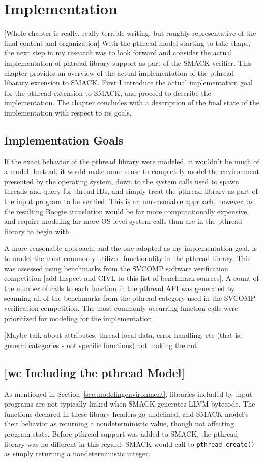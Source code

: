 \chapter{Implementation}\label{ch:implementation}
[Whole chapter is really, really terrible writing, but roughly
representative of the final content and organization]
With the pthread model starting to take shape, the next step in my
research was to look forward and consider the actual implementation of
phtread library support as part of the SMACK verifier.  This chapter
provides an overview of the actual implementation of the pthread
libarary extension to SMACK.  First I introduce the actual
implementation goal for the pthread extension to SMACK, and proceed to
describe the implementation.  The chapter concludes with a description
of the final state of the implementation with respect to its goals.

\section{Implementation Goals}
If the exact behavior of the pthread library were modeled, it wouldn't
be much of a model.  Instead, it would make more sense to completely
model the environment presented by the operating system, down to the
system calls used to spawn threads and query for thread IDs, and
simply treat the pthread library as part of the input program to be
verified. This is an unreasonable approach, however, as the resulting
Boogie translation would be far more computationally expensive, and
require modeling far more OS level system calls than are in the
pthread library to begin with.

A more reasonable approach, and the one adopted as my implementation
goal,  is to model the most commonly utilized functionality in the
pthread library.  This was assessed using benchmarks from the SVCOMP
software verification competition [add Inspect and CIVL to this list
of benchmark sources].  A count of the number of calls to
each function in the pthread API was generated by scanning all of the
benchmarks from the pthread category used in the SVCOMP verification
competition.  The most commonly occurring function calls were
prioritized for modeling for the implementation.

[Maybe talk about attributes, thread local data, error handling, etc
(that is, general categories - not specific functions) not making the
cut] 

\section{[wc Including the pthread Model]}
As mentioned in Section~\ref{sec:modelingenvironment}, libraries
included by input programs are not typically linked when SMACK
generates LLVM bytecode.  The functions declared in these library
headers go undefined, and SMACK model's their behavior as returning a
nondeterministic value, though not affecting program state.  Before
pthread support was added to SMACK, the pthread library was no
different in this regard.  SMACK would call to
\lstinline|pthread_create()| as simply returning a nondeterministic
integer.

